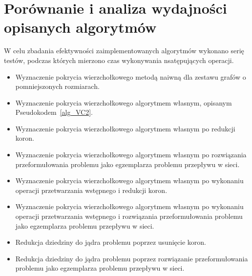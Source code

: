 \section{Porównanie i analiza wydajności opisanych algorytmów}
\par{
  W celu zbadania efektywności zaimplementowanych algorytmów wykonano serię testów, podczas których mierzono czas wykonywania nsatępujących operacji.
  \begin{itemize}
    \item Wyznaczenie pokrycia wierzchołkowego metodą naiwną dla zestawu grafów o pomniejszonych rozmiarach.
    \item Wyznaczenie pokrycia wierzchołkowego algorytmem własnym, opisanym Pseudokodem~\ref{alg_VC2}.
    \item Wyznaczenie pokrycia wierzchołkowego algorytmem własnym po redukcji koron.
    \item Wyznaczenie pokrycia wierzchołkowego algorytmem własnym po rozwiązania przeformułowania problemu jako egzemplarza problemu przepływu w sieci.
    \item Wyznaczenie pokrycia wierzchołkowego algorytmem własnym po wykonaniu operacji przetwarzania wstępnego i redukcji koron.
    \item Wyznaczenie pokrycia wierzchołkowego algorytmem własnym po wykonaniu operacji przetwarzania wstępnego i rozwiązania przeformułowania problemu jako egzemplarza problemu przepływu w sieci.
    \item Redukcja dziedziny do jądra problemu poprzez usunięcie koron.
    \item Redukcja dziedziny do jądra problemu poprzez rozwiązanie przeformułowania problemu jako egzemplarza problemu przepływu w sieci.
  \end{itemize}
}
